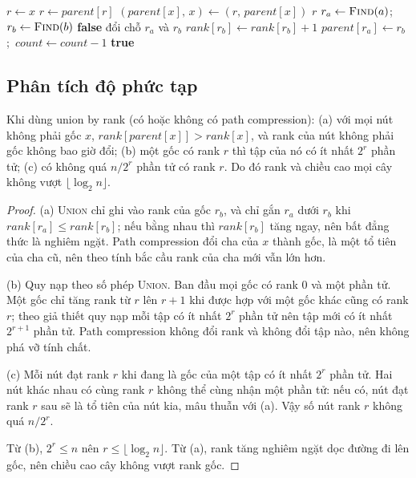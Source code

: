 \begin{algorithm}[t]
\caption{\textsc{Find} hai lượt và \textsc{Union} by rank}
\label{alg:nw-dsu}
\begin{algorithmic}[1]
  \State $r \gets x$
   
    \State $r \gets \mathit{parent}[r]$
  \EndWhile
   
    \State $(\mathit{parent}[x],\, x) \gets (r,\, \mathit{parent}[x])$
  \EndWhile
  \State \Return $r$
\EndFunction
{}
  \State $r_a \gets \Call{Find}{a}$;\ $r_b \gets \Call{Find}{b}$
    \State \Return \textbf{false} 
  \EndIf
    \State đổi chỗ $r_a$ và $r_b$
  \EndIf
    \State $\mathit{rank}[r_b] \gets \mathit{rank}[r_b] + 1$
  \EndIf
  \State $\mathit{parent}[r_a] \gets r_b$;\ $\mathit{count} \gets \mathit{count} - 1$
  \State \Return \textbf{true}
\EndFunction
\end{algorithmic}
\end{algorithm}

\subsection{Phân tích độ phức tạp}

\begin{lemma}\label{lem:nw-rank}
Khi dùng union by rank (có hoặc không có path compression): (a) với mọi nút không phải gốc $x$, $\mathit{rank}[\mathit{parent}[x]] > \mathit{rank}[x]$, và rank của nút không phải gốc không bao giờ đổi; (b) một gốc có rank $r$ thì tập của nó có ít nhất $2^r$ phần tử; (c) có không quá $n/2^r$ phần tử có rank $r$. Do đó rank và chiều cao mọi cây không vượt $\lfloor\log_2 n\rfloor$.
\end{lemma}

\begin{proof}
(a) \textsc{Union} chỉ ghi vào rank của gốc $r_b$, và chỉ gắn $r_a$ dưới $r_b$ khi $\mathit{rank}[r_a] \le \mathit{rank}[r_b]$; nếu bằng nhau thì $\mathit{rank}[r_b]$ tăng ngay, nên bất đẳng thức là nghiêm ngặt. Path compression đổi cha của $x$ thành gốc, là một tổ tiên của cha cũ, nên theo tính bắc cầu rank của cha mới vẫn lớn hơn.

(b) Quy nạp theo số phép \textsc{Union}. Ban đầu mọi gốc có rank 0 và một phần tử. Một gốc chỉ tăng rank từ $r$ lên $r+1$ khi được hợp với một gốc khác cũng có rank $r$; theo giả thiết quy nạp mỗi tập có ít nhất $2^r$ phần tử nên tập mới có ít nhất $2^{r+1}$ phần tử. Path compression không đổi rank và không đổi tập nào, nên không phá vỡ tính chất.

(c) Mỗi nút đạt rank $r$ khi đang là gốc của một tập có ít nhất $2^r$ phần tử. Hai nút khác nhau có cùng rank $r$ không thể cùng nhận một phần tử: nếu có, nút đạt rank $r$ sau sẽ là tổ tiên của nút kia, mâu thuẫn với (a). Vậy số nút rank $r$ không quá $n/2^r$.

Từ (b), $2^r \le n$ nên $r \le \lfloor\log_2 n\rfloor$. Từ (a), rank tăng nghiêm ngặt dọc đường đi lên gốc, nên chiều cao cây không vượt rank gốc.
\end{proof}


